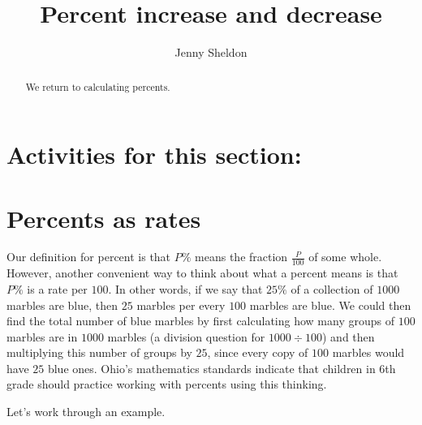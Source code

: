 \documentclass{ximera}
\title{Percent increase and decrease}
\author{Jenny Sheldon}
\begin{document}
\begin{abstract}
We return to calculating percents.
\end{abstract}
\maketitle

\section{Activities for this section:} 

\section{Percents as rates}

Our definition for percent is that $P\%$ means the fraction $\frac{P}{100}$ of some whole. However, another convenient way to think about what a percent means is that $P\%$ is a rate per $100$. In other words, if we say that $25\%$ of a collection of $1000$ marbles are blue, then $25$ marbles per every $100$ marbles are blue. We could then find the total number of blue marbles by first calculating how many groups of $100$ marbles are in $1000$ marbles (a division question for $1000 \div 100$) and then multiplying this number of groups by $25$, since every copy of $100$ marbles would have $25$ blue ones. Ohio's mathematics standards indicate that children in 6th grade should practice working with percents using this thinking.

Let's work through an example.
\end{document}
